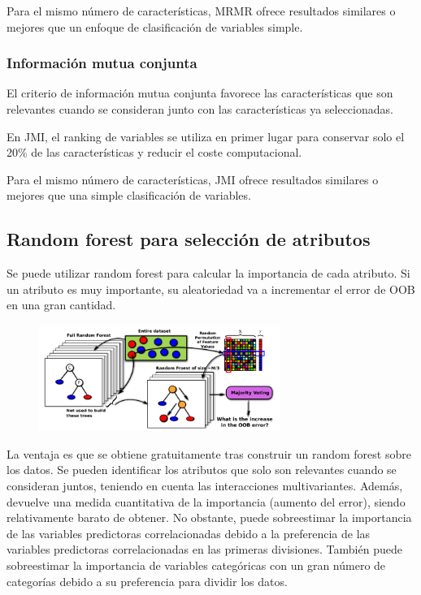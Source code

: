 Para el mismo número de características, MRMR ofrece resultados similares o mejores que un enfoque de clasificación de variables simple.

\subsubsection{Información mutua conjunta}
El criterio de información mutua conjunta favorece las características que son relevantes cuando se consideran junto con las características ya seleccionadas.

En JMI, el ranking de variables se utiliza en primer lugar para conservar solo el 20\% de las características y reducir el coste computacional.

Para el mismo número de características, JMI ofrece resultados similares o mejores que una simple clasificación de variables.

\subsection{Random forest para selección de atributos}
Se puede utilizar random forest para calcular la importancia de cada atributo. Si un atributo es muy importante, su aleatoriedad va a incrementar el error de OOB en una gran cantidad.

\begin{figure}[h]
\centering
\includegraphics[width = 0.7\textwidth]{figs/random-forest-feature-selection.png}
\end{figure}

La ventaja es que se obtiene gratuitamente tras construir un random forest sobre los datos. Se pueden identificar los atributos que solo son relevantes cuando se consideran juntos, teniendo en cuenta las interacciones multivariantes. Además, devuelve una medida cuantitativa de la importancia (aumento del error), siendo relativamente barato de obtener. No obstante, puede sobreestimar la importancia de las variables predictoras correlacionadas debido a la preferencia de las variables predictoras correlacionadas en las primeras divisiones. También puede sobreestimar la importancia de variables categóricas con un gran número de categorías debido a su preferencia para dividir los datos.

